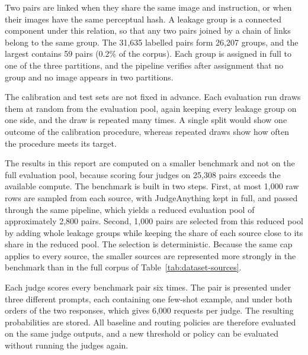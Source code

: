 \documentclass[11pt]{article}
\begin{document}
Two pairs are linked when they share the same image and instruction, or when their images have the same perceptual hash. A leakage group is a connected component under this relation, so that any two pairs joined by a chain of links belong to the same group. The 31,635 labelled pairs form 26,207 groups, and the largest contains 59 pairs (0.2\% of the corpus). Each group is assigned in full to one of the three partitions, and the pipeline verifies after assignment that no group and no image appears in two partitions.

The calibration and test sets are not fixed in advance. Each evaluation run draws them at random from the evaluation pool, again keeping every leakage group on one side, and the draw is repeated many times. A single split would show one outcome of the calibration procedure, whereas repeated draws show how often the procedure meets its target.

The results in this report are computed on a smaller benchmark and not on the full evaluation pool, because scoring four judges on 25,308 pairs exceeds the available compute. The benchmark is built in two steps. First, at most 1,000 raw rows are sampled from each source, with JudgeAnything kept in full, and passed through the same pipeline, which yields a reduced evaluation pool of approximately 2,800 pairs. Second, 1,000 pairs are selected from this reduced pool by adding whole leakage groups while keeping the share of each source close to its share in the reduced pool. The selection is deterministic. Because the same cap applies to every source, the smaller sources are represented more strongly in the benchmark than in the full corpus of Table~\ref{tab:dataset-sources}.

Each judge scores every benchmark pair six times. The pair is presented under three different prompts, each containing one few-shot example, and under both orders of the two responses, which gives 6,000 requests per judge. The resulting probabilities are stored. All baseline and routing policies are therefore evaluated on the same judge outputs, and a new threshold or policy can be evaluated without running the judges again.


\end{document}
